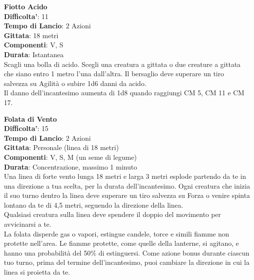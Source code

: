 \begin{multicols}{2}
\medskip\textbf{Fiotto Acido}\\
\textbf{Difficolta'}: 11\\
\textbf{Tempo di Lancio}: 2 Azioni\\
\textbf{Gittata}: 18 metri\\
\textbf{Componenti}: V, S\\
\textbf{Durata}: Istantanea\\
Scagli una bolla di acido. Scegli una creatura a gittata o due creature a gittata che siano entro 1 metro l’una dall’altra. Il bersaglio deve superare un tiro salvezza su Agilità o subire 1d6 danni da acido.\\
Il danno dell’incantesimo aumenta di 1d8 quando raggiungi CM 5, CM 11 e CM 17.

\medskip\textbf{Folata di Vento}\\
\textbf{Difficolta'}: 15\\
\textbf{Tempo di Lancio}: 2 Azioni\\
\textbf{Gittata}: Personale (linea di 18 metri)\\
\textbf{Componenti}: V, S, M (un seme di legume)\\
\textbf{Durata}: Concentrazione, massimo 1 minuto\\
Una linea di forte vento lunga 18 metri e larga 3 metri esplode partendo da te in una direzione a tua scelta, per la durata dell’incantesimo. Ogni creatura che inizia il suo turno dentro la linea deve superare un tiro salvezza su Forza o venire spinta lontano da te di 4,5 metri, seguendo la direzione della linea.\\
Qualsiasi creatura sulla linea deve spendere il doppio del movimento per avvicinarsi a te.\\
La folata disperde gas o vapori, estingue candele, torce e simili fiamme non protette nell’area. Le fiamme protette, come quelle della lanterne, si agitano, e hanno una probabilità del 50\% di estinguersi. Come azione bonus durante ciascun tuo turno, prima del termine dell’incantesimo, puoi cambiare la direzione in cui la linea si proietta da te.


\end{multicols}
